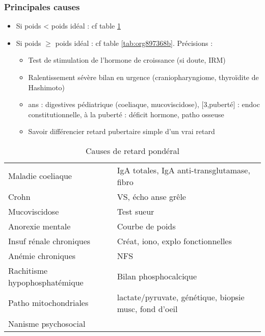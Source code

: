 \documentclass[11pt]{article}
\begin{document}
\subsubsection{Principales causes}
\label{sec:orgc73a3cc}
\begin{itemize}
\item Si poids < poids idéal : cf table \ref{tab:org52f187b}
\item Si poids \(\ge\) poids idéal : cf table \ref{tab:org897368b}. Précisions :
\begin{itemize}
\item Test de stimulation de l'hormone de croissance (\danger si doute, IRM)
\item Ralentissement sévère \thus bilan en urgence (craniopharyngiome, thyroïdite de
Hashimoto) \faBomb
\item\relax [0, 3] ans : digestives pédiatrique (coeliaque, mucoviscidose), [3,puberté] :
endoc constitutionnelle, à la puberté : déficit hormone, patho osseuse
\item Savoir différencier retard pubertaire simple d'un vrai retard
\end{itemize}
\end{itemize}

\begin{table}[htbp]
\caption{\label{tab:org52f187b}
Causes de retard pondéral}
\centering
\begin{tabular}{ll}
Maladie coeliaque & IgA totales, IgA anti-transglutamase, fibro\\
Crohn & VS, écho anse grêle\\
Mucoviscidose & Test sueur\\
Anorexie mentale & Courbe de poids\\
Insuf rénale chroniques & Créat, iono, explo fonctionnelles\\
Anémie chroniques & NFS\\
Rachitisme hypophosphatémique & Bilan phosphocalcique\\
Patho mitochondriales & lactate/pyruvate, génétique, biopsie musc, fond d'oeil\\
Nanisme psychosocial & \\
\end{tabular}
\end{table}
\end{document}
